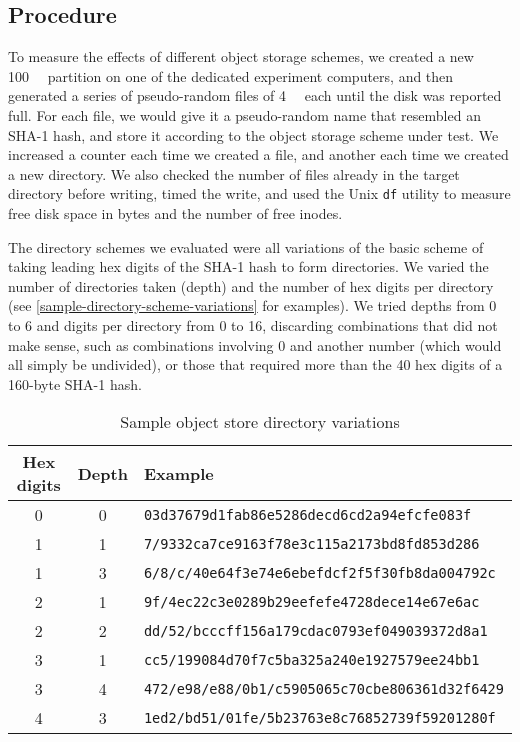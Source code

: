 %


\subsection{Procedure}

To measure the effects of different object storage schemes, we created a new
\SI{100}{\mebi\byte} partition on one of the dedicated experiment computers, and then generated a series
of pseudo-random files of \SI{4}{\kibi\byte} each until the disk was reported
full. For each file, we would give it a pseudo-random name that resembled an
SHA-1 hash, and store it according to the object storage scheme under test. We
increased a counter each time we created a file, and another each time we
created a new directory. We also checked the number of files already in the
target directory before writing, timed the write, and used the Unix
\lstinline{df} utility to measure free disk space in bytes and the number of
free inodes.

The directory schemes we evaluated were all variations of the basic scheme of
taking leading hex digits of the SHA-1 hash to form directories. We varied the
number of directories taken (depth) and the number of hex digits per directory
(see \autoref{sample-directory-scheme-variations} for examples). We tried depths
from \num{0} to \num{6} and digits per directory from \num{0} to \num{16},
discarding combinations that did not make sense, such as combinations involving
\num{0} and another number (which would all simply be undivided), or those that
required more than the \num{40} hex digits of a \num{160}-byte SHA-1 hash.

\begin{table}[]
    \caption{Sample object store directory variations}
    \label{sample-directory-scheme-variations}
    \centering
    \begin{tabular}{c c l}
        Hex digits & Depth & Example \\
        \midrule
        0 & 0 & \lstinline{03d37679d1fab86e5286decd6cd2a94efcfe083f} \\
        1 & 1 & \lstinline{7/9332ca7ce9163f78e3c115a2173bd8fd853d286} \\
        1 & 3 & \lstinline{6/8/c/40e64f3e74e6ebefdcf2f5f30fb8da004792c} \\
        2 & 1 & \lstinline{9f/4ec22c3e0289b29eefefe4728dece14e67e6ac} \\
        2 & 2 & \lstinline{dd/52/bcccff156a179cdac0793ef049039372d8a1} \\
        3 & 1 & \lstinline{cc5/199084d70f7c5ba325a240e1927579ee24bb1} \\
        3 & 4 & \lstinline{472/e98/e88/0b1/c5905065c70cbe806361d32f6429} \\
        4 & 3 & \lstinline{1ed2/bd51/01fe/5b23763e8c76852739f59201280f} \\
    \end{tabular}
\end{table}

